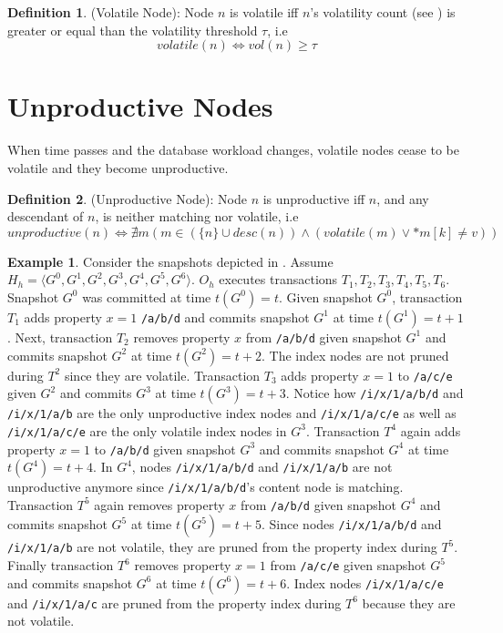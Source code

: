 \documentclass[abstracton,12pt]{scrartcl}
\theoremstyle{definition}
\newtheorem{definition}{Definition}
\newtheorem{example}{Example}
\begin{document}
\begin{definition}
  (Volatile Node): Node $n$ is volatile iff $n$'s volatility count (see
  ) is greater or equal than the volatility threshold
  $\tau$, i.e
  $$ volatile(n) \iff vol(n) \geq \tau $$
\end{definition}

\section{Unproductive Nodes}

When time passes and the database workload changes, volatile nodes cease to be
volatile and they become unproductive.
\begin{definition}
  (Unproductive Node): Node $n$ is unproductive iff $n$, and any descendant of
  $n$, is neither matching nor volatile, i.e
  $$ unproductive(n) \iff \nexists m (m \in (\{n\} \cup desc(n)) \land
  (volatile(m) \lor *m[k] \neq v)) $$
\end{definition}

\begin{example}
  Consider the snapshots depicted in . Assume $H_h
  = \langle G^0,G^1,G^2,G^3,G^4,G^5,G^6 \rangle$. $O_h$ executes transactions
  $T_1, T_2, T_3, T_4, T_5, T_6$. Snapshot $G^0$ was committed at time $t(G^0) =
  t$. Given snapshot $G^0$, transaction $T_1$ adds property $x=1$
  \texttt{/a/b/d} and commits snapshot $G^1$ at time $t(G^1) = t + 1$. Next,
  transaction $T_2$ removes property $x$ from \texttt{/a/b/d} given snapshot
  $G^1$ and commits snapshot $G^2$ at time $t(G^2) = t + 2$. The index nodes are
  not pruned during $T^2$ since they are volatile. Transaction $T_3$ adds
  property $x=1$ to \texttt{/a/c/e} given $G^2$ and commits $G^3$ at time
  $t(G^3) = t+3$. Notice how \texttt{/i/x/1/a/b/d} and \texttt{/i/x/1/a/b} are
  the only unproductive index nodes and \texttt{/i/x/1/a/c/e} as well as
  \texttt{/i/x/1/a/c/e} are the only volatile index nodes in $G^3$. Transaction
  $T^4$ again adds property $x=1$ to \texttt{/a/b/d} given snapshot $G^3$ and
  commits snapshot $G^4$ at time $t(G^4) = t+4$. In $G^4$, nodes
  \texttt{/i/x/1/a/b/d} and \texttt{/i/x/1/a/b} are not unproductive anymore
  since \texttt{/i/x/1/a/b/d}'s content node is matching. Transaction $T^5$
  again removes property $x$ from \texttt{/a/b/d} given snapshot $G^4$ and
  commits snapshot $G^5$ at time $t(G^5) = t+5$. Since nodes
  \texttt{/i/x/1/a/b/d} and \texttt{/i/x/1/a/b} are not volatile, they are
  pruned from the property index during $T^5$. Finally transaction $T^6$ removes
  property $x=1$ from \texttt{/a/c/e} given snapshot $G^5$ and commits snapshot
  $G^6$ at time $t(G^6) = t+6$. Index nodes \texttt{/i/x/1/a/c/e} and
  \texttt{/i/x/1/a/c} are pruned from the property index during $T^6$ because
  they are not volatile.
\end{example}
\end{document}
